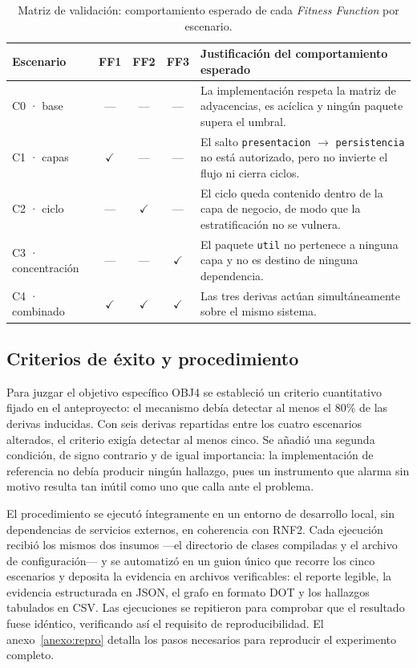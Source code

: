 \begin{table}[H]
\centering
\caption{Matriz de validación: comportamiento esperado de cada \textit{Fitness Function} por escenario.}
\label{tab:matrizEsperada}
\footnotesize
\begin{tabularx}{\textwidth}{p{2.6cm}cccX}
\toprule
\textbf{Escenario} & \textbf{FF1} & \textbf{FF2} & \textbf{FF3} & \textbf{Justificación del comportamiento esperado} \\
\midrule
C0 · base & --- & --- & --- & La implementación respeta la matriz de adyacencias, es acíclica y ningún paquete supera el umbral. \\
\midrule
C1 · capas & $\checkmark$ & --- & --- & El salto \texttt{presentacion} $\rightarrow$ \texttt{persistencia} no está autorizado, pero no invierte el flujo ni cierra ciclos. \\
\midrule
C2 · ciclo & --- & $\checkmark$ & --- & El ciclo queda contenido dentro de la capa de negocio, de modo que la estratificación no se vulnera. \\
\midrule
C3 · concentración & --- & --- & $\checkmark$ & El paquete \texttt{util} no pertenece a ninguna capa y no es destino de ninguna dependencia. \\
\midrule
C4 · combinado & $\checkmark$ & $\checkmark$ & $\checkmark$ & Las tres derivas actúan simultáneamente sobre el mismo sistema. \\
\bottomrule
\end{tabularx}
\end{table}

\subsection{Criterios de éxito y procedimiento}
Para juzgar el objetivo específico OBJ4 se estableció un criterio cuantitativo fijado en el anteproyecto: el mecanismo debía detectar al menos el $80\%$ de las derivas inducidas. Con seis derivas repartidas entre los cuatro escenarios alterados, el criterio exigía detectar al menos cinco. Se añadió una segunda condición, de signo contrario y de igual importancia: la implementación de referencia no debía producir ningún hallazgo, pues un instrumento que alarma sin motivo resulta tan inútil como uno que calla ante el problema.

El procedimiento se ejecutó íntegramente en un entorno de desarrollo local, sin dependencias de servicios externos, en coherencia con RNF2. Cada ejecución recibió los mismos dos insumos ---el directorio de clases compiladas y el archivo de configuración--- y se automatizó en un guion único que recorre los cinco escenarios y deposita la evidencia en archivos verificables: el reporte legible, la evidencia estructurada en JSON, el grafo en formato DOT y los hallazgos tabulados en CSV. Las ejecuciones se repitieron para comprobar que el resultado fuese idéntico, verificando así el requisito de reproducibilidad. El anexo~\ref{anexo:repro} detalla los pasos necesarios para reproducir el experimento completo.

